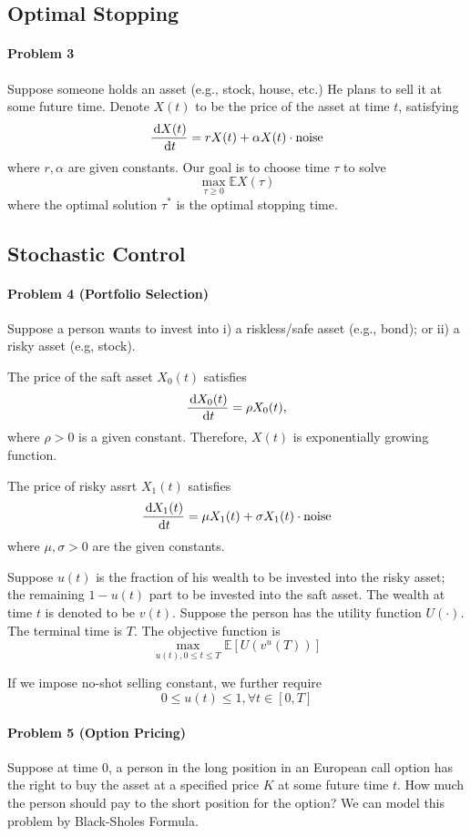 \subsection{Optimal Stopping}
\paragraph{Problem 3} Suppose someone holds an asset (e.g., stock, house, etc.) He plans to sell it at some future time. Denote $X(t)$ to be the price of the asset at time $t$, satisfying
\[
\frac{\,\mathrm{d} X(t)}{\,\mathrm{d} t}=rX(t)+\alpha X(t)\cdot\mbox{noise}
\]
where $r,\alpha$ are given constants. Our goal is to choose time $\tau$ to solve
\[
\max_{\tau\ge0}\mathbb{E}X(\tau)
\]
where the optimal solution $\tau^*$ is the optimal stopping time.

\subsection{Stochastic Control}
\paragraph{Problem 4 (Portfolio Selection)}
Suppose a person wants to invest into i) a riskless/safe asset (e.g., bond); or ii) a risky asset (e.g, stock).

The price of the saft asset $X_0(t)$ satisfies 
\[
\frac{\,\mathrm{d} X_0(t)}{\,\mathrm{d} t}=\rho X_0(t),
\]
where $\rho>0$ is a given constant. Therefore, $X(t)$ is exponentially growing function.

The price of risky assrt $X_1(t)$ satisfies
\[
\frac{\,\mathrm{d} X_1(t)}{\,\mathrm{d} t}=\mu X_1(t)+\sigma X_1(t)\cdot\mbox{noise}
\]
where $\mu,\sigma>0$ are the given constants.

Suppose $u(t)$ is the fraction of his wealth to be invested into the risky asset; the remaining $1-u(t)$ part to be invested into the saft asset. 
The wealth at time $t$ is denoted to be $v(t)$. 
Suppose the person has the utility function $U(\cdot)$.
The terminal time is $T$.
The objective function is
\[
\max_{u(t),0\le t\le T}\mathbb{E}[U(v^u(T))]
\]

If we impose no-shot selling constant, we further require
\[
0\le u(t)\le 1,\forall t\in[0,T]
\]

\paragraph{Problem 5 (Option Pricing)}
Suppose at time $0$, a person in the long position in an European call option has the right to buy the asset at a specified price $K$ at some future time $t$. How much the person should pay to the short position for the option? We can model this problem by Black-Sholes Formula.









